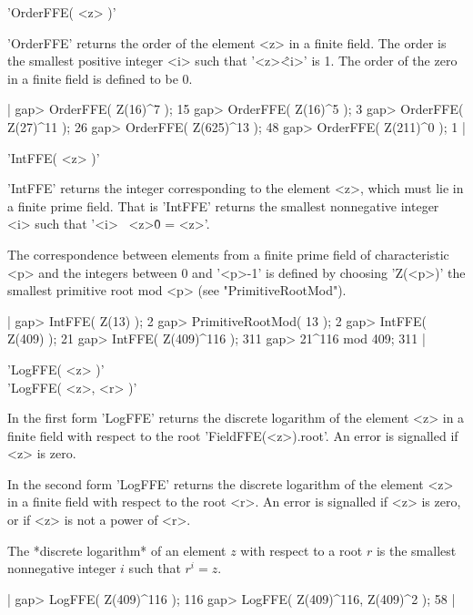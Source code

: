 'OrderFFE( <z> )'

'OrderFFE' returns the order of  the element <z> in  a finite field.  The
order  is the smallest positive integer <i> such  that  '<z>\^<i>'  is 1.
The order of the zero in a finite field is defined to be 0.

|    gap> OrderFFE( Z(16)^7 );
    15
    gap> OrderFFE( Z(16)^5 );
    3
    gap> OrderFFE( Z(27)^11 );
    26
    gap> OrderFFE( Z(625)^13 );
    48
    gap> OrderFFE( Z(211)^0 );
    1 |


'IntFFE( <z> )'

'IntFFE' returns the integer corresponding to the element <z>, which must
lie in  a finite  prime field.   That is  'IntFFE' returns  the  smallest
nonnegative integer <i> such that '<i> \*\ <z>\^ 0 = <z>'.

The  correspondence between   elements   from a finite   prime field   of
characteristic <p> and the integers between 0  and  '<p>-1' is defined by
choosing 'Z(<p>)'  the     smallest  primitive  root    mod   <p>    (see
"PrimitiveRootMod").

|    gap> IntFFE( Z(13) );
    2
    gap> PrimitiveRootMod( 13 );
    2
    gap> IntFFE( Z(409) );
    21
    gap> IntFFE( Z(409)^116 );
    311
    gap> 21^116 mod 409;
    311 |


'LogFFE( <z> )' \\
'LogFFE( <z>, <r> )'

In the first form 'LogFFE' returns  the discrete logarithm of the element
<z> in a finite field with respect to the  root 'FieldFFE(<z>).root'.  An
error is signalled if <z> is zero.

In the second form 'LogFFE' returns the discrete logarithm of the element
<z> in  a  finite  field with  respect  to  the  root <r>.   An  error is
signalled if <z> is zero, or if <z> is not a power of <r>.

The *discrete logarithm* of an element $z$ with  respect to a root $r$ is
the smallest nonnegative integer $i$ such that $r^i = z$.

|    gap> LogFFE( Z(409)^116 );
    116
    gap> LogFFE( Z(409)^116, Z(409)^2 );
    58 |

